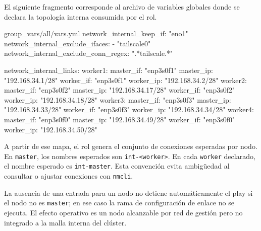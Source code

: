 El siguiente fragmento corresponde al archivo de variables globales donde se declara la topología interna consumida por el rol.

\begin{filecode}{group_vars/all/vars.yml}
network_internal_keep_if: "eno1"
network_internal_exclude_ifaces:
  - "tailscale0"
network_internal_exclude_conn_regex: ".*tailscale.*"

network_internal_links:
  worker1:
    master_if: "enp3s0f1"
    master_ip: "192.168.34.1/28"
    worker_if: "enp3s0f1"
    worker_ip: "192.168.34.2/28"
  worker2:
    master_if: "enp3s0f2"
    master_ip: "192.168.34.17/28"
    worker_if: "enp3s0f2"
    worker_ip: "192.168.34.18/28"
  worker3:
    master_if: "enp3s0f3"
    master_ip: "192.168.34.33/28"
    worker_if: "enp3s0f3"
    worker_ip: "192.168.34.34/28"
  worker4:
    master_if: "enp3s0f0"
    master_ip: "192.168.34.49/28"
    worker_if: "enp3s0f0"
    worker_ip: "192.168.34.50/28"
\end{filecode}

A partir de ese mapa, el rol genera el conjunto de conexiones esperadas por nodo. En \texttt{master}, los nombres esperados son \texttt{int-<worker>}. En cada \texttt{worker} declarado, el nombre esperado es \texttt{int-master}. Esta convención evita ambigüedad al consultar o ajustar conexiones con \texttt{nmcli}.

La ausencia de una entrada para un nodo no detiene automáticamente el play si el nodo no es \texttt{master}; en ese caso la rama de configuración de enlace no se ejecuta. El efecto operativo es un nodo alcanzable por red de gestión pero no integrado a la malla interna del clúster.

